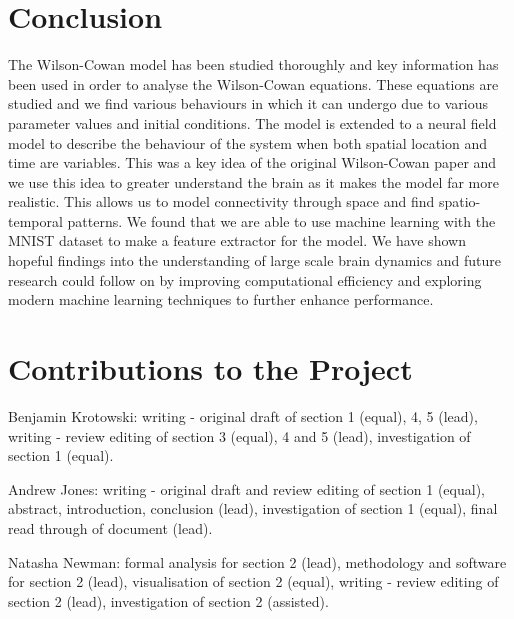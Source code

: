\documentclass[10pt]{article}
\begin{document}
\begin{flushleft}
    \section*{Conclusion}
    The Wilson-Cowan model has been studied thoroughly and key information has been used in order to analyse the Wilson-Cowan equations. These equations are studied and we find various behaviours in which it can undergo due to various parameter values and initial conditions. The model is extended to a neural field model to describe the behaviour of the system when both spatial location and time are variables. This was a key idea of the original Wilson-Cowan paper and we use this idea to greater understand the brain as it makes the model far more realistic. This allows us to model connectivity through space and find spatio-temporal patterns. We found that we are able to use machine learning with the MNIST dataset to make a feature extractor for the model. We have shown hopeful findings into the understanding of large scale brain dynamics and future research could follow on by improving computational efficiency and exploring modern machine learning techniques to further enhance performance.


\section{Contributions to the Project}


Benjamin Krotowski: writing - original draft of section 1 (equal), 4, 5 (lead), writing - review editing of section 3 (equal), 4 and 5 (lead), investigation of section 1 (equal).
\newline

Andrew Jones:  writing - original draft and review editing of section 1 (equal), abstract, introduction, conclusion (lead), investigation of section 1 (equal), final read through of document (lead).
\newline

Natasha Newman: formal analysis for section 2 (lead), methodology and software for section 2 (lead), visualisation of section 2 (equal), writing - review editing of section 2 (lead), investigation of section 2 (assisted).
\newline


\end{flushleft}
\end{document}
